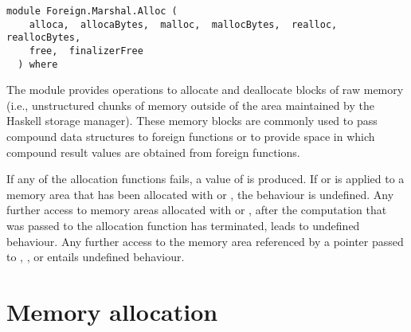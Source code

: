 \label{module:Foreign.Marshal.Alloc}
\haddockbeginheader
{\haddockverb\begin{verbatim}
module Foreign.Marshal.Alloc (
    alloca,  allocaBytes,  malloc,  mallocBytes,  realloc,  reallocBytes, 
    free,  finalizerFree
  ) where\end{verbatim}}
\haddockendheader

The module  provides operations to allocate and
deallocate blocks of raw memory (i.e., unstructured chunks of memory
outside of the area maintained by the Haskell storage manager).  These
memory blocks are commonly used to pass compound data structures to
foreign functions or to provide space in which compound result values
are obtained from foreign functions.
\par
If any of the allocation functions fails, a value of  is
produced.  If  or  is applied to a memory area
that has been allocated with  or , the
behaviour is undefined.  Any further access to memory areas allocated with
 or , after the computation that was passed to
the allocation function has terminated, leads to undefined behaviour.  Any
further access to the memory area referenced by a pointer passed to
, , or  entails undefined
behaviour.
\par

\section{Memory allocation
}
